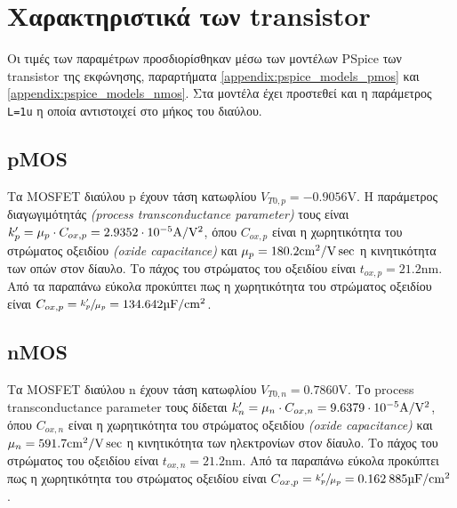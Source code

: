 \section{Χαρακτηριστικά των transistor}
	Οι τιμές των παραμέτρων προσδιορίσθηκαν μέσω των μοντέλων PSpice των transistor της εκφώνησης, παραρτήματα \ref{appendix:pspice_models_pmos} και \ref{appendix:pspice_models_nmos}. Στα μοντέλα έχει προστεθεί και η παράμετρος \texttt{L=1u} η οποία αντιστοιχεί στο μήκος του διαύλου.\par

	\subsection{pMOS}
	Τα MOSFET διαύλου p έχουν τάση κατωφλίου $V_{T0,p}=-0.9056\unit{\volt}$. Η παράμετρος διαγωγιμότητάς \textsl{(process transconductance parameter)} τους είναι $k_p^\prime=\mu_p\cdot C_{ox,p}=2.9352\cdot 10^{-5}\unit{\ampere\per{\volt^2}}$, όπου $C_{ox,p}$ είναι η χωρητικότητα του στρώματος οξειδίου \textsl{(oxide capacitance)} και $\mu_p=180.2\unit{{\centi\meter}^2\per{\volt\sec}}$ η κινητικότητα των οπών στον δίαυλο.\cite{sedra} Το πάχος του στρώματος του οξειδίου είναι $t_{ox,p}=21.2\unit{\nano\meter}$. Από τα παραπάνω εύκολα προκύπτει πως η χωρητικότητα του στρώματος οξειδίου είναι $C_{ox,p}=\sfrac{k_p^\prime}{\mu_p}=134.642\unit{\micro\farad\per{\centi\meter}^2}$.

\subsection{nMOS}
	Τα MOSFET διαύλου n έχουν τάση κατωφλίου $V_{T0,n}=0.7860\unit{\volt}$. Το process transconductance parameter τους δίδεται $k_n^\prime=\mu_n\cdot C_{ox,n}=9.6379\cdot 10^{-5}\unit{\ampere\per{\volt^2}}$, όπου $C_{ox,n}$ είναι η χωρητικότητα του στρώματος οξειδίου \textsl{(oxide capacitance)} και $\mu_n=591.7\unit{{\centi\meter}^2\per{\volt\sec}}$ η κινητικότητα των ηλεκτρονίων στον δίαυλο.\cite{sedra} Το πάχος του στρώματος του οξειδίου είναι $t_{ox,n}=21.2\unit{\nano\meter}$. Από τα παραπάνω εύκολα προκύπτει πως η χωρητικότητα του στρώματος οξειδίου είναι $C_{ox,p}=\sfrac{k_p^\prime}{\mu_p}=0.162\:885\unit{\micro\farad\per{\centi\meter}^2}$.